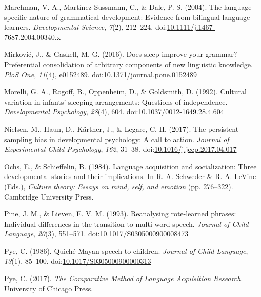 \documentclass[floatsintext,man]{apa6}
\theoremstyle{definition}
\theoremstyle{definition}
\theoremstyle{definition}
\theoremstyle{remark}
\begin{document}
\hypertarget{ref-marchman2004language}{}
Marchman, V. A., Martínez-Sussmann, C., \& Dale, P. S. (2004). The
language-specific nature of grammatical development: Evidence from
bilingual language learners. \emph{Developmental Science}, \emph{7}(2),
212--224.
doi:\href{https://doi.org/10.1111/j.1467-7687.2004.00340.x}{10.1111/j.1467-7687.2004.00340.x}

\hypertarget{ref-mirkovic2016does}{}
Mirković, J., \& Gaskell, M. G. (2016). Does sleep improve your grammar?
Preferential consolidation of arbitrary components of new linguistic
knowledge. \emph{PloS One}, \emph{11}(4), e0152489.
doi:\href{https://doi.org/10.1371/journal.pone.0152489}{10.1371/journal.pone.0152489}

\hypertarget{ref-morelli1992cultural}{}
Morelli, G. A., Rogoff, B., Oppenheim, D., \& Goldsmith, D. (1992).
Cultural variation in infants' sleeping arrangements: Questions of
independence. \emph{Developmental Psychology}, \emph{28}(4), 604.
doi:\href{https://doi.org/10.1037/0012-1649.28.4.604}{10.1037/0012-1649.28.4.604}

\hypertarget{ref-nielsen2017persistent}{}
Nielsen, M., Haun, D., Kärtner, J., \& Legare, C. H. (2017). The
persistent sampling bias in developmental psychology: A call to action.
\emph{Journal of Experimental Child Psychology}, \emph{162}, 31--38.
doi:\href{https://doi.org/10.1016/j.jecp.2017.04.017}{10.1016/j.jecp.2017.04.017}

\hypertarget{ref-ochs1984language}{}
Ochs, E., \& Schieffelin, B. (1984). Language acquisition and
socialization: Three developmental stories and their implications. In R.
A. Schweder \& R. A. LeVine (Eds.), \emph{Culture theory: Essays on
mind, self, and emotion} (pp. 276--322). Cambridge University Press.

\hypertarget{ref-pine1993reanalysing}{}
Pine, J. M., \& Lieven, E. V. M. (1993). Reanalysing rote-learned
phrases: Individual differences in the transition to multi-word speech.
\emph{Journal of Child Language}, \emph{20}(3), 551--571.
doi:\href{https://doi.org/10.1017/S0305000900008473}{10.1017/S0305000900008473}

\hypertarget{ref-pye1986quiche}{}
Pye, C. (1986). Quiché Mayan speech to children. \emph{Journal of Child
Language}, \emph{13}(1), 85--100.
doi:\href{https://doi.org/10.1017/S0305000900000313}{10.1017/S0305000900000313}

\hypertarget{ref-pye2017comparative}{}
Pye, C. (2017). \emph{The Comparative Method of Language Acquisition
Research}. University of Chicago Press.
\end{document}

